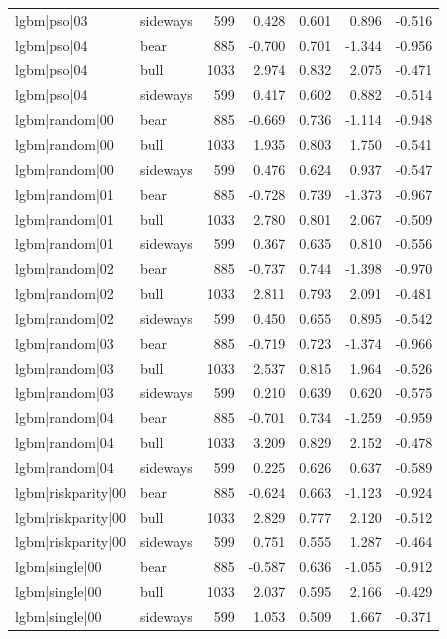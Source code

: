 \begin{table}
\begin{tabular}{llrrrrr}
lgbm|pso|03 & sideways & 599 & 0.428 & 0.601 & 0.896 & -0.516 \\
lgbm|pso|04 & bear & 885 & -0.700 & 0.701 & -1.344 & -0.956 \\
lgbm|pso|04 & bull & 1033 & 2.974 & 0.832 & 2.075 & -0.471 \\
lgbm|pso|04 & sideways & 599 & 0.417 & 0.602 & 0.882 & -0.514 \\
lgbm|random|00 & bear & 885 & -0.669 & 0.736 & -1.114 & -0.948 \\
lgbm|random|00 & bull & 1033 & 1.935 & 0.803 & 1.750 & -0.541 \\
lgbm|random|00 & sideways & 599 & 0.476 & 0.624 & 0.937 & -0.547 \\
lgbm|random|01 & bear & 885 & -0.728 & 0.739 & -1.373 & -0.967 \\
lgbm|random|01 & bull & 1033 & 2.780 & 0.801 & 2.067 & -0.509 \\
lgbm|random|01 & sideways & 599 & 0.367 & 0.635 & 0.810 & -0.556 \\
lgbm|random|02 & bear & 885 & -0.737 & 0.744 & -1.398 & -0.970 \\
lgbm|random|02 & bull & 1033 & 2.811 & 0.793 & 2.091 & -0.481 \\
lgbm|random|02 & sideways & 599 & 0.450 & 0.655 & 0.895 & -0.542 \\
lgbm|random|03 & bear & 885 & -0.719 & 0.723 & -1.374 & -0.966 \\
lgbm|random|03 & bull & 1033 & 2.537 & 0.815 & 1.964 & -0.526 \\
lgbm|random|03 & sideways & 599 & 0.210 & 0.639 & 0.620 & -0.575 \\
lgbm|random|04 & bear & 885 & -0.701 & 0.734 & -1.259 & -0.959 \\
lgbm|random|04 & bull & 1033 & 3.209 & 0.829 & 2.152 & -0.478 \\
lgbm|random|04 & sideways & 599 & 0.225 & 0.626 & 0.637 & -0.589 \\
lgbm|riskparity|00 & bear & 885 & -0.624 & 0.663 & -1.123 & -0.924 \\
lgbm|riskparity|00 & bull & 1033 & 2.829 & 0.777 & 2.120 & -0.512 \\
lgbm|riskparity|00 & sideways & 599 & 0.751 & 0.555 & 1.287 & -0.464 \\
lgbm|single|00 & bear & 885 & -0.587 & 0.636 & -1.055 & -0.912 \\
lgbm|single|00 & bull & 1033 & 2.037 & 0.595 & 2.166 & -0.429 \\
lgbm|single|00 & sideways & 599 & 1.053 & 0.509 & 1.667 & -0.371 \\

\end{tabular}
\end{table}
